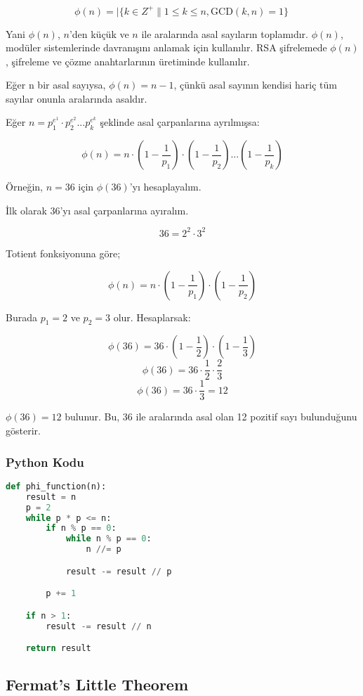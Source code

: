 \[ \phi(n) = |\{ k \in Z^{+} \| 1 \leq k \leq n, \text{GCD}(k, n) = 1 \}\ \]

Yani $\phi(n)$, $n$'den küçük ve $n$ ile aralarında asal sayıların toplamıdır. $\phi(n)$, modüler sistemlerinde davranışını anlamak için kullanılır. RSA şifrelemede $\phi(n)$, şifreleme ve çözme anahtarlarının üretiminde kullanılır.

Eğer n bir asal sayıysa, $\phi(n) = n - 1$, çünkü asal sayının kendisi hariç tüm sayılar onunla aralarında asaldır.

Eğer $n = p_{1}^{e^1} \cdot p_{2}^{e^2} ... p_{k}^{e^k}$ şeklinde asal çarpanlarına ayrılmışsa:

\[ \phi(n) = n \cdot (1 - \frac{1}{p_1}) \cdot (1 - \frac{1}{p_2}) ... (1 - \frac{1}{p_k}) \]

Örneğin, $n = 36$ için $\phi(36)$'yı hesaplayalım.

İlk olarak 36'yı asal çarpanlarına ayıralım.

\[ 36 = 2^2 \cdot 3^2 \]

Totient fonksiyonuna göre;

\[ \phi(n) = n \cdot (1 - \frac{1}{p_1}) \cdot (1 - \frac{1}{p_2}) \]

Burada $p_1 = 2$ ve $p_2 = 3$ olur. Hesaplarsak:

\[ \phi(36) = 36 \cdot (1 - \frac{1}{2}) \cdot (1 - \frac{1}{3}) \]
\[ \phi(36) = 36 \cdot \frac{1}{2} \cdot \frac{2}{3} \]
\[ \phi(36) = 36 \cdot \frac{1}{3} = 12 \]

$\phi(36) = 12$ bulunur. Bu, 36 ile aralarında asal olan 12 pozitif sayı bulunduğunu gösterir.

\subsubsection{Python Kodu}

\begin{lstlisting}[language=Python]
def phi_function(n):
    result = n
    p = 2
    while p * p <= n:
        if n % p == 0:
            while n % p == 0:
                n //= p

            result -= result // p

        p += 1

    if n > 1:
        result -= result // n

    return result
\end{lstlisting}

\newpage

\subsection{Fermat's Little Theorem}

